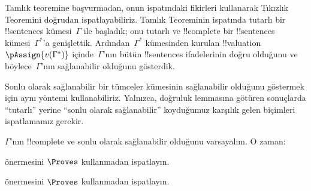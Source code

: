 

      {}
      {}


Tamlık teoremine başvurmadan, onun ispatındaki fikirleri kullanarak
Tıkızlık Teoremini doğrudan ispatlayabiliriz. Tamlık Teoreminin
ispatında tutarlı bir !!{sentence}s kümesi~$\Gamma$ ile başladık; onu
tutarlı ve !!{complete} bir
!!{sentence}s kümesi~$\Gamma^*$'a genişlettik. Ardından~$\Gamma^*$
kümesinden kurulan 
{!!{valuation}~$\pAssign{v(\Gamma^*)}$} içinde~$\Gamma$'nın bütün
!!{sentence}s ifadelerinin doğru olduğunu ve böylece~$\Gamma$'nın
sağlanabilir olduğunu gösterdik.

Sonlu olarak sağlanabilir bir tümceler kümesinin sağlanabilir olduğunu
göstermek için aynı yöntemi kullanabiliriz. Yalnızca, doğruluk lemmasına
götüren sonuçlarda ``tutarlı'' yerine ``sonlu olarak sağlanabilir''
koyduğumuz karşılık gelen biçimleri ispatlamamız gerekir.

\begin{prop}
$\Gamma$'nın !!{complete} ve sonlu olarak sağlanabilir olduğunu
varsayalım. O zaman:
\begin{enumerate}
\end{enumerate}
\end{prop}

\begin{prob}
 önermesini $\Proves$ kullanmadan
ispatlayın.
\end{prob}
\tagendprob

\begin{prob}
 önermesini $\Proves$ kullanmadan
ispatlayın.
\end{prob}
\tagendprob


